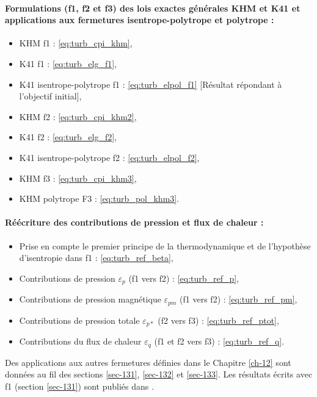 {\begin{minipage}[c]{\linewidth}
\paragraph{Formulations (f1, f2 et f3) des lois exactes générales \acs{KHM} et \acs{K41} et applications aux fermetures isentrope-polytrope et polytrope :} 
\begin{itemize}
    \item \acs{KHM} f1 :  \eqref{eq:turb_cpi_khm},
    \item \acs{K41} f1 :  \eqref{eq:turb_elg_f1},
    \item \acs{K41} isentrope-polytrope f1 :  \eqref{eq:turb_elpol_f1} [Résultat répondant à l'objectif initial],
    \item \acs{KHM} f2 :  \eqref{eq:turb_cpi_khm2},
    \item \acs{K41} f2 :  \eqref{eq:turb_elg_f2},
    \item \acs{K41} isentrope-polytrope f2 :  \eqref{eq:turb_elpol_f2},
    \item \acs{KHM} f3 :  \eqref{eq:turb_cpi_khm3},
    \item \acs{KHM} polytrope F3 :  \eqref{eq:turb_pol_khm3}.
\end{itemize}

\paragraph{Réécriture des contributions de pression et flux de chaleur :}
\begin{itemize}
    \item Prise en compte le premier principe de la thermodynamique et de l'hypothèse d'isentropie dans f1 :  \eqref{eq:turb_ref_beta},
    \item Contributions de pression $\varepsilon_p$ (f1 vers f2) : \eqref{eq:turb_ref_p},
    \item Contributions de pression magnétique $\varepsilon_{pm}$ (f1 vers f2) : \eqref{eq:turb_ref_pm},
    \item Contributions de pression totale $\varepsilon_{p*}$ (f2 vers f3) : \eqref{eq:turb_ref_ptot},
    \item Contributions du flux de chaleur $\varepsilon_{q}$ (f1 et f2 vers f3) : \eqref{eq:turb_ref_q}.\\
\end{itemize}

Des applications aux autres fermetures définies dans le Chapitre \ref{ch-12} sont données au fil des sections \ref{sec-131}, \ref{sec-132} et \ref{sec-133}.
Les résultats écrits avec f1 (section \ref{sec-131}) sont publiés dans \cite{simon_general_2021}. 
\end{minipage}}


 
